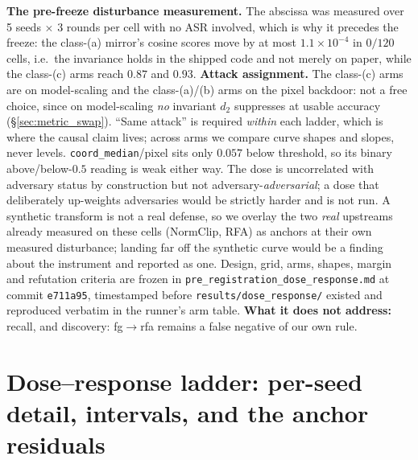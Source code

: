 \documentclass{article}
\begin{document}
\textbf{The pre-freeze disturbance measurement.} The abscissa was measured over 5 seeds $\times$ 3 rounds per cell with no ASR involved, which is why it precedes the freeze: the class-(a) mirror's cosine scores move by at most $1.1{\times}10^{-4}$ in $0/120$ cells, i.e.\ the invariance holds in the shipped code and not merely on paper, while the class-(c) arms reach $0.87$ and $0.93$. \textbf{Attack assignment.} The class-(c) arms are on model-scaling and the class-(a)/(b) arms on the pixel backdoor: not a free choice, since on model-scaling \emph{no} invariant $d_2$ suppresses at usable accuracy (\S\ref{sec:metric_swap}). ``Same attack'' is required \emph{within} each ladder, which is where the causal claim lives; across arms we compare curve shapes and slopes, never levels. \texttt{coord\_median}/pixel sits only $0.057$ below threshold, so its binary above/below-$0.5$ reading is weak either way. The dose is uncorrelated with adversary status by construction but not adversary-\emph{adversarial}; a dose that deliberately up-weights adversaries would be strictly harder and is not run. A synthetic transform is not a real defense, so we overlay the two \emph{real} upstreams already measured on these cells (NormClip, RFA) as anchors at their own measured disturbance; landing far off the synthetic curve would be a finding about the instrument and reported as one. Design, grid, arms, shapes, margin and refutation criteria are frozen in \texttt{pre\_registration\_dose\_response.md} at commit \texttt{e711a95}, timestamped before \texttt{results/dose\_response/} existed and reproduced verbatim in the runner's arm table. \textbf{What it does not address:} recall, and discovery: fg$\to$rfa remains a false negative of our own rule.

\section{Dose--response ladder: per-seed detail, intervals, and the anchor residuals}
\label{app:dose_detail}
\end{document}
